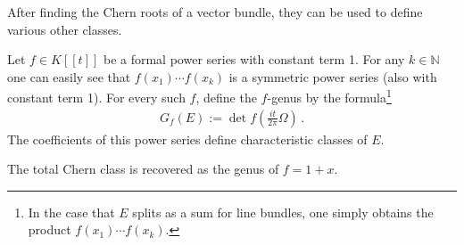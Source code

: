 
    After finding the Chern roots of a vector bundle, they can be used to define various other classes.
    \begin{construct}[Genus]
        Let $f\in K[[t]]$ be a formal power series with constant term 1. For any $k\in\mathbb{N}$ one can easily see that $f(x_1)\cdots f(x_k)$ is a symmetric power series (also with constant term 1). For every such $f$, define the $f$-genus by the formula\footnote{In the case that $E$ splits as a sum for line bundles, one simply obtains the product $f(x_1)\cdots f(x_k)$.}
        \begin{gather}
            G_f(E) := \det f\left(\frac{it}{2\pi}\Omega\right)\,.
        \end{gather}
        The coefficients of this power series define characteristic classes of $E$.
    \end{construct}

    \begin{example}
        The total Chern class is recovered as the genus of $f=1+x$.
    \end{example}

